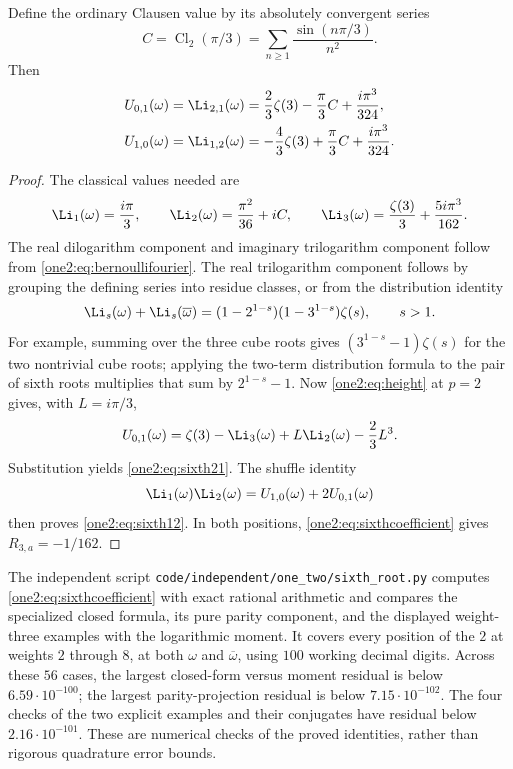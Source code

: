 \begin{corollary}
\label{one2:ex:sixththree}
Define the ordinary Clausen value by its absolutely convergent series
\[
 C=\operatorname{Cl}_2(\pi/3)
   =\sum_{n\ge1}\frac{\sin(n\pi/3)}{n^2}.
\]
Then
\begin{align}
 U_{0,1}(\omega)=\Li_{2,1}(\omega)
  &=\frac23\zeta(3)-\frac\pi3 C+\frac{i\pi^3}{324},
    \label{one2:eq:sixth21}\\
 U_{1,0}(\omega)=\Li_{1,2}(\omega)
  &=-\frac43\zeta(3)+\frac\pi3 C+\frac{i\pi^3}{324}.
    \label{one2:eq:sixth12}
\end{align}
\end{corollary}
\begin{proof}
The classical values needed are
\[
 \Li_1(\omega)=\frac{i\pi}{3},\qquad
 \Li_2(\omega)=\frac{\pi^2}{36}+iC,\qquad
 \Li_3(\omega)=\frac{\zeta(3)}3+\frac{5i\pi^3}{162}.
\]
The real dilogarithm component and imaginary trilogarithm component
follow from \eqref{one2:eq:bernoullifourier}.  The real
trilogarithm component follows by grouping the defining series
into residue classes, or from the distribution identity
\[
 \Li_s(\omega)+\Li_s(\overline\omega)
   =(1-2^{1-s})(1-3^{1-s})\zeta(s),\qquad s>1.
\]
For example, summing over the three cube roots gives
$(3^{1-s}-1)\zeta(s)$ for the two nontrivial cube roots;
applying the two-term distribution formula to the pair of sixth
roots multiplies that sum by $2^{1-s}-1$.
Now \eqref{one2:eq:height} at $p=2$ gives, with $L=i\pi/3$,
\[
 U_{0,1}(\omega)
   =\zeta(3)-\Li_3(\omega)+L\Li_2(\omega)-\frac23L^3.
\]
Substitution yields \eqref{one2:eq:sixth21}.  The shuffle identity
\[
 \Li_1(\omega)\Li_2(\omega)
     =U_{1,0}(\omega)+2U_{0,1}(\omega)
\]
then proves \eqref{one2:eq:sixth12}.  In both positions,
\eqref{one2:eq:sixthcoefficient} gives $R_{3,a}=-1/162$.
\end{proof}

The independent script \texttt{code/independent/one\_two/sixth\_root.py}
computes \eqref{one2:eq:sixthcoefficient} with exact rational
arithmetic and compares the specialized closed formula, its pure
parity component, and the displayed weight-three examples with the
logarithmic moment.  It covers every position of the $2$ at weights
$2$ through $8$, at both $\omega$ and $\overline\omega$, using
$100$ working decimal digits.  Across these $56$ cases, the largest
closed-form versus moment residual is below $6.59\cdot10^{-100}$;
the largest parity-projection residual is below $7.15\cdot10^{-102}$.
The four checks of the two explicit examples and their conjugates
have residual below $2.16\cdot10^{-101}$.  These are numerical checks
of the proved identities, rather than rigorous quadrature error bounds.
